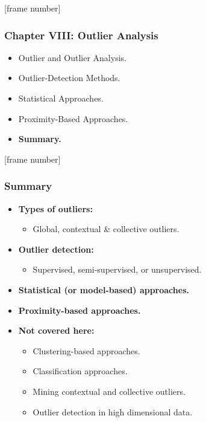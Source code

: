 \documentclass[aspectratio=169,t,xcolor=dvipsnames]{beamer}
\begin{document}
{
  [frame number]
  \begin{frame}
  	\frametitle{Chapter VIII: Outlier Analysis}
  	\begin{itemize}
  		\item Outlier and Outlier Analysis.
  		\item Outlier-Detection Methods.
  		\item Statistical Approaches.
  		\item Proximity-Based Approaches.
  		\item \textbf{Summary.}
  	\end{itemize}
  \end{frame}
}

{
  [frame number]
  \begin{frame}
  	\frametitle{Summary}
  	\begin{itemize}
  		\item  \textbf{Types of outliers:}
  		      \begin{itemize}
  		      	\item Global, contextual \& collective outliers.
  		      \end{itemize}
  		\item \textbf{Outlier detection:}
  		      \begin{itemize}
  		      	\item Supervised, semi-supervised, or unsupervised.
  		      \end{itemize}
  		\item \textbf{Statistical (or model-based) approaches.}
  		\item \textbf{Proximity-based approaches.}
  		\item \textbf{Not covered here:}
  		      \begin{itemize}
  		      	\item Clustering-based approaches.
  		      	\item Classification approaches.
  		      	\item Mining contextual and collective outliers.
  		      	\item Outlier detection in high dimensional data.
  		      \end{itemize}
  	\end{itemize}
  \end{frame}
}
\end{document}
